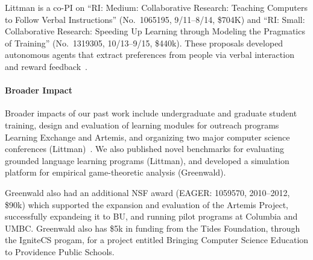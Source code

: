 Littman is a co-PI on ``RI: Medium: Collaborative Research: Teaching
Computers to Follow Verbal Instructions'' (No.\ 1065195, 9/11--8/14,
\$704K) and ``RI: Small: Collaborative Research: Speeding Up Learning
through Modeling the Pragmatics of Training'' (No.\ 1319305,
10/13--9/15, \$440k). These proposals developed autonomous agents that
extract preferences from people via verbal interaction and reward
feedback~\cite{loftin14b,macglashan15,macglashan15b}.

\vspace{\up}
\paragraph{Broader Impact}

Broader impacts of our past work include undergraduate and graduate
student training, design and evaluation of learning modules for
outreach programs Learning Exchange and Artemis, and organizing two
major computer science conferences (Littman)~\cite{desjardins13}.
We also published novel benchmarks for evaluating grounded language
learning programs (Littman), and developed a simulation platform for
empirical game-theoretic analysis (Greenwald).

Greenwald also had an additional NSF award (EAGER: 1059570,
2010--2012, \$90k) which supported the expansion and evaluation of the
Artemis Project,
successfully expandeing it to BU, and running pilot programs at
Columbia and UMBC. 
%
Greenwald also has \$5k in funding from the Tides Foundation, through
the IgniteCS progam, for a project entitled Bringing Computer Science
Education to Providence Public Schools.

